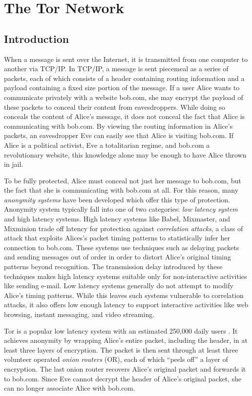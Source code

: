 \chapter{The Tor Network}
\section*{Introduction}
When a message is sent over the Internet, it is transmitted from one computer to another via TCP/IP. In TCP/IP, a message is sent piecemeal as a series of packets, each of which consists of a header containing routing information and a payload containing a fixed size portion of the message. If a user Alice wants to communicate privately with a website bob.com, she may encrypt the payload of these packets to conceal their content from eavesdroppers. While doing so conceals the content of Alice's message, it does not conceal the fact that Alice is communicating with bob.com. By viewing the routing information in Alice's packets, an eavesdropper Eve can easily see that Alice is visiting bob.com. If Alice is a political activist, Eve a totalitarian regime, and bob.com a revolutionary website, this knowledge alone may be enough to have Alice thrown in jail.

To be fully protected, Alice must conceal not just her message to bob.com, but the fact that she is communicating with bob.com at all. For this reason, many \textit{anonymity systems} have been developed which offer this type of protection. Anonymity system typically fall into one of two categories: \textit{low latency system} and high latency systems. High latency systems like Babel, Mixmaster, and Mixminion trade off latency for protection against \textit{correlation attacks}, a class of attack that exploits Alices's packet timing patterns to statistically infer her connection to bob.com. These systems use techniques such as delaying packets and sending messages out of order in order to distort Alice's original timing patterns beyond recognition. The transmission delay introduced by these techniques makes high latency systems suitable only for non-interactive activities like sending e-mail. Low latency systems generally do not attempt to modify Alice's timing patterns. While this leaves such systems vulnerable to correlation attacks, it also offers low enough latency to support interactive activities like web browsing, instant messaging, and video streaming.

Tor is a popular low latency system with an estimated 250,000 daily users \citep{exptorwpaper}. It achieves anonymity by wrapping Alice's entire packet, including the header, in at least three layers of encryption. The packet is then sent through at least three volunteer operated \textit{onion routers} (OR), each of which ``peels off'' a layer of encryption. The last onion router recovers Alice's original packet and forwards it to bob.com. Since Eve cannot decrypt the header of Alice's original packet, she can no longer associate Alice with bob.com.

